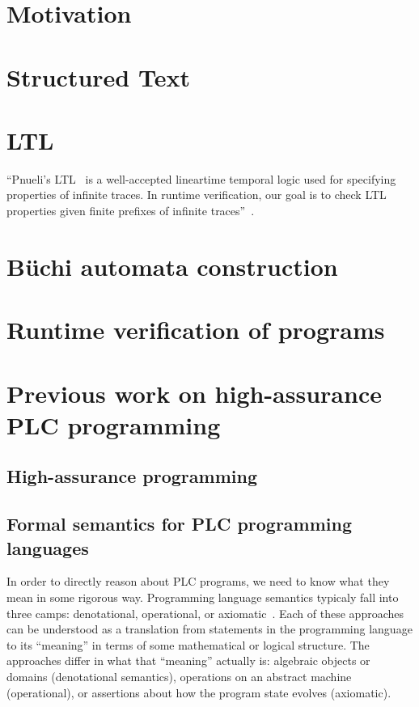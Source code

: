 \section{Motivation}

\section{Structured Text}

\section{LTL}

``Pnueli’s LTL~\cite{pnueli:ltl} is a well-accepted lineartime temporal logic
used for specifying properties of infinite traces. In runtime verification, our
goal is to check LTL properties given finite prefixes of infinite
traces''~\cite{bauer:rv_ltl}.

\section{B\"uchi automata construction}

\section{Runtime verification of programs}

\section{Previous work on high-assurance PLC programming}

\subsection{High-assurance programming}

\subsection{Formal semantics for PLC programming languages}

In order to directly reason about PLC programs, we need to know what they mean
in some rigorous way. Programming language semantics typicaly fall into three
camps: denotational, operational, or axiomatic~\cite{hoare:axiomatic}. Each of
these approaches can be understood as a translation from statements in the
programming language to its ``meaning'' in terms of some mathematical or logical
structure. The approaches differ in what that ``meaning'' actually is: algebraic
objects or domains (denotational semantics), operations on an abstract machine
(operational), or assertions about how the program state evolves (axiomatic).

